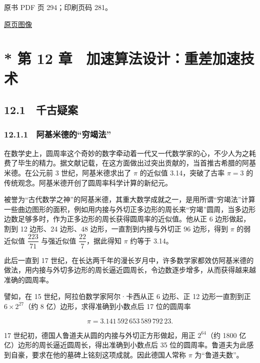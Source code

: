 \clearpage

原书 PDF 页 294；印刷页码 281。

\href{source-images/pdf-294.jpeg}{原页图像}

\section{* 第 12 章　加速算法设计：重差加速技术}\label{ch12-ux7b2c-12-ux7ae0-ux52a0ux901fux7b97ux6cd5ux8bbeux8ba1ux91cdux5deeux52a0ux901fux6280ux672f}

\subsection{12.1　千古疑案}\label{ch12-ux5343ux53e4ux7591ux6848}

\subsubsection{12.1.1　阿基米德的``穷竭法''}\label{ch12-ux963fux57faux7c73ux5fb7ux7684ux7a77ux7aedux6cd5}

在数学史上，圆周率这个奇妙的数字牵动着一代又一代数学家的心，不少人为之耗费了毕生的精力。据文献记载，在这方面做出过突出贡献的，当首推古希腊的阿基米德。在公元前 3 世纪，阿基米德求出了 \(\pi\) 的近似值 3.14，突破了古率 \(\pi=3\) 的传统观念。阿基米德开创了圆周率科学计算的新纪元。

被誉为``古代数学之神''的阿基米德，其重大数学成就之一，是用所谓``穷竭法''计算一些曲边图形的面积，例如用内接与外切正多边形的周长来``穷竭''圆周，当多边形边数足够多时，作为正多边形的周长获得圆周率的近似值。他从正 6 边形做起，割到 12 边形、24 边形、48 边形，一直割到内接与外切正 96 边形，得到 \(\pi\) 的弱近似值 \(\dfrac{223}{71}\) 与强近似值 \(\dfrac{22}{7}\)，据此得知 \(\pi\) 约等于 3.14。

此后一直到 17 世纪，在长达两千年的漫长岁月中，许多数学家都效仿阿基米德的做法，用内接与外切多边形的周长逼近圆周长，令边数逐步增多，从而获得越来越准确的圆周率。

譬如，在 15 世纪，阿拉伯数学家阿尔·卡西从正 6 边形、正 12 边形一直割到正 \(6\times2^{27}\)（约 8 亿）边形，求得准确到小数点后 17 位的圆周率

\[
\pi=3.141\,592\,653\,589\,792\,23.
\]

17 世纪初，德国人鲁道夫从圆的内接与外切正方形做起，用正 \(2^{64}\)（约 1800 亿亿）边形的周长逼近圆周长，得出准确到小数点后 35 位的圆周率。鲁道夫为此感到自豪，要求在他的墓碑上铭刻这项成就。因此德国人常称 \(\pi\) 为``鲁道夫数''。

